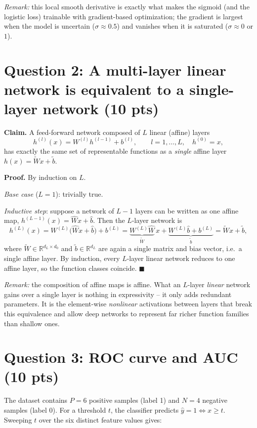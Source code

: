 \documentclass[11pt,a4paper]{article}
\newcommand{\R}{\mathbb{R}}
\begin{document}
\emph{Remark:} this local smooth derivative is exactly what makes the sigmoid (and the
logistic loss) trainable with gradient-based optimization; the gradient is largest when
the model is uncertain ($\sigma\approx0.5$) and vanishes when it is saturated
($\sigma\approx 0$ or $1$).

\section{Question 2: A multi-layer linear network is equivalent to a single-layer network (10 pts)}

\textbf{Claim.} A feed-forward network composed of $L$ linear (affine) layers
\[
h^{(l)}(x)=W^{(l)}h^{(l-1)}+b^{(l)},\qquad l=1,\dots,L,\quad h^{(0)}=x,
\]
has exactly the same set of representable functions as a \emph{single} affine layer
$h(x)=\tilde{W}x+\tilde{b}$.

\textbf{Proof.} By induction on $L$.

\emph{Base case} ($L=1$): trivially true.

\emph{Inductive step}: suppose a network of $L-1$ layers can be written as one affine
map, $h^{(L-1)}(x)=\hat{W}x+\hat{b}$. Then the $L$-layer network is
\[
h^{(L)}(x) = W^{(L)}\bigl(\hat{W}x+\hat{b}\bigr)+b^{(L)}
          = \underbrace{W^{(L)}\hat{W}}_{\tilde{W}}\,x
            + \underbrace{W^{(L)}\hat{b}+b^{(L)}}_{\tilde{b}}
          = \tilde{W}x+\tilde{b},
\]
where $\tilde{W}\in\R^{d_L\times d_0}$ and $\tilde{b}\in\R^{d_L}$ are again a single
matrix and bias vector, i.e.\ a single affine layer. By induction, every $L$-layer
linear network reduces to one affine layer, so the function classes coincide.
$\blacksquare$

\emph{Remark:} the composition of affine maps is affine. What an $L$-layer \emph{linear}
network gains over a single layer is nothing in expressivity -- it only adds redundant
parameters. It is the element-wise \emph{nonlinear} activations between layers that
break this equivalence and allow deep networks to represent far richer function
families than shallow ones.

\section{Question 3: ROC curve and AUC (10 pts)}

The dataset contains $P=6$ positive samples (label 1) and $N=4$ negative samples
(label 0). For a threshold $t$, the classifier predicts $\hat y = 1 \iff x \geq t$.
Sweeping $t$ over the six distinct feature values gives:
\end{document}
